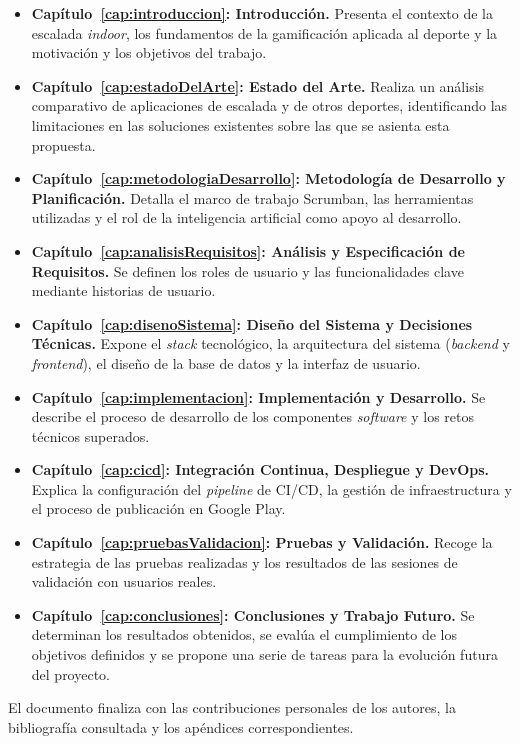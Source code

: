 \begin{itemize}
    \item \textbf{Capítulo~\ref{cap:introduccion}: Introducción.} Presenta el contexto de la escalada \textit{indoor}, los 
	fundamentos de la 
	gamificación aplicada al deporte y la motivación y los objetivos del trabajo.

    \item \textbf{Capítulo~\ref{cap:estadoDelArte}: Estado del Arte.} Realiza un análisis comparativo de aplicaciones de escalada y 
	de otros 
	deportes, identificando las limitaciones en las soluciones existentes sobre las que se asienta esta propuesta.

    \item \textbf{Capítulo~\ref{cap:metodologiaDesarrollo}: Metodología de Desarrollo y Planificación.} Detalla el marco de trabajo 
	Scrumban, 
	las herramientas utilizadas y el rol de la inteligencia artificial como apoyo al desarrollo.

    \item \textbf{Capítulo~\ref{cap:analisisRequisitos}: Análisis y Especificación de Requisitos.} Se definen los roles de usuario y 
	las funcionalidades clave mediante historias de usuario.

    \item \textbf{Capítulo~\ref{cap:disenoSistema}: Diseño del Sistema y Decisiones Técnicas.} Expone el \textit{stack} tecnológico, 
	la arquitectura del sistema (\textit{backend} y \textit{frontend}), el diseño de la base de datos y la interfaz de usuario.

    \item \textbf{Capítulo~\ref{cap:implementacion}: Implementación y Desarrollo.} Se describe el proceso de desarrollo de los 
	componentes \textit{software} y los retos técnicos superados.

    \item \textbf{Capítulo~\ref{cap:cicd}: Integración Continua, Despliegue y DevOps.} Explica la configuración del \textit{pipeline} 
	de CI/CD, la gestión de infraestructura y el proceso de publicación en Google Play.

    \item \textbf{Capítulo~\ref{cap:pruebasValidacion}: Pruebas y Validación.} Recoge la estrategia de las pruebas realizadas y los 
	resultados de las sesiones de validación con usuarios reales.

    \item \textbf{Capítulo~\ref{cap:conclusiones}: Conclusiones y Trabajo Futuro.} Se determinan los resultados obtenidos, se evalúa el 
	cumplimiento de los objetivos definidos y se propone una serie de tareas para la evolución futura del proyecto.
\end{itemize}

El documento finaliza con las contribuciones personales de los autores, la bibliografía consultada y los apéndices correspondientes.